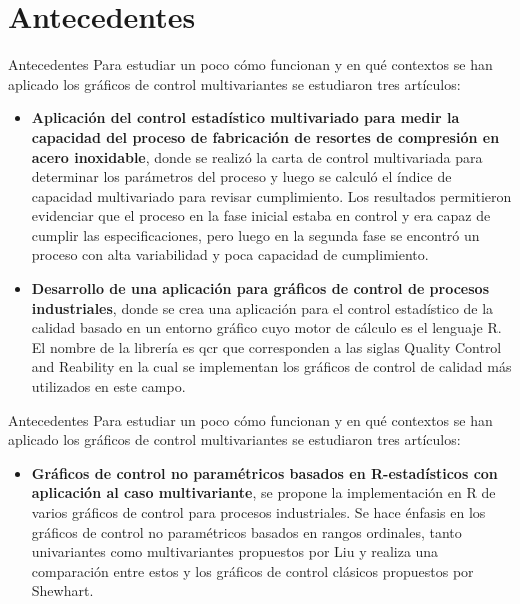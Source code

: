 \documentclass[10pt]{beamer}
\begin{document}
\section{Antecedentes}
\begin{frame}{Antecedentes}
Para estudiar un poco cómo funcionan y en qué contextos se han aplicado los gráficos de control multivariantes se estudiaron tres artículos:
\begin{itemize}
\justifying
\item \textbf{Aplicación del control estadístico multivariado para medir la capacidad del proceso de fabricación de resortes de compresión en acero inoxidable}\textbf{\cite{A1}}, donde se realizó la carta de control multivariada para determinar los parámetros del proceso y luego se calculó el índice de capacidad multivariado para revisar cumplimiento. Los resultados permitieron evidenciar que el proceso en la fase inicial estaba en control y era capaz de cumplir las especificaciones, pero luego en la segunda fase se encontró un proceso con alta variabilidad y poca capacidad de cumplimiento.
\item  \textbf{Desarrollo de una aplicación para gráficos de control de procesos industriales}\textbf{\cite{A2}}, donde se crea una aplicación para el control estadístico de la calidad basado en un entorno gráfico cuyo motor de cálculo es el lenguaje R. El nombre de la librería es qcr que corresponden a las siglas Quality Control and Reability en la cual se implementan los gráficos de control de calidad más utilizados en este
campo.
\end{itemize}   
\end{frame}

\begin{frame}{Antecedentes}
Para estudiar un poco cómo funcionan y en qué contextos se han aplicado los gráficos de control multivariantes se estudiaron tres artículos:
\begin{itemize}
\justifying
\item \textbf{Gráficos de control no paramétricos basados en R-estadísticos con aplicación al caso multivariante}\textbf{\cite{A3}}, se propone la implementación en R de varios gráficos de control para procesos industriales. Se hace énfasis en los gráficos de control no paramétricos basados en rangos ordinales, tanto univariantes como multivariantes propuestos por Liu y realiza una comparación entre estos y los gráficos de control clásicos propuestos por Shewhart.
\end{itemize}    
\end{frame}
\end{document}
